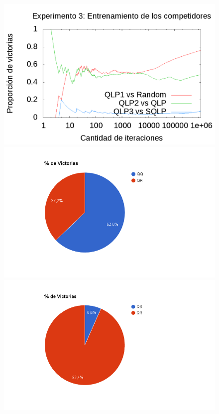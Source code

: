 \documentclass[10pt, a4paper]{article}
\begin{document}
\begin{figure}[H]
  \begin{minipage}[c]{1\textwidth}
  \includegraphics[scale=0.2]{E3train.png}
  \includegraphics[scale=0.3]{QQvsQR.png}
  \includegraphics[scale=0.3]{QRvsQS.png}

\end{minipage}
\end{figure}
\end{document}
